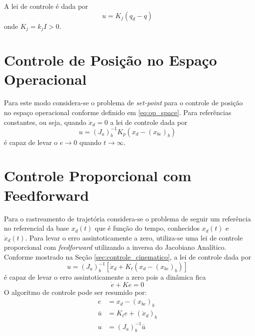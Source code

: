 A lei de controle é dada por 
\begin{equation}
{u} = {K}_j ({q}_d - {q})
\end{equation}
onde ${K_j} = k_j {I} > 0$.

\section{Controle de Posição no Espaço Operacional} \label{sec:pos_operacional}
Para este modo considera-se o problema de \textit{set-point} para o controle de posição no espaço operacional conforme definido em \ref{eq:op_space}. Para referências constantes, ou seja, quando $\dot{{x}}_d = 0$ a lei de controle dada por
\begin{equation} \label{eq:lei_posicao}
{u} = ({J}_{a})_b^{-1} {K}_p ( {x_d} - ({x_{be}})_b)
\end{equation}
é capaz de levar o ${e} \rightarrow 0$ quando $t \rightarrow \infty$.

\section{Controle Proporcional com Feedforward} \label{sec:pplusf}
Para o rastreamento de trajetória considera-se o problema de seguir um referência no referencial da base ${x}_d(t)$ que é função do tempo, conhecidos ${x}_d(t)$ e ${\dot{x}}_d(t)$. Para levar o erro assintoticamente a zero, utiliza-se uma lei de controle proporcional com \textit{feedforward} utilizando a inversa do Jacobiano Analítico. Conforme mostrado na Seção \ref{sec:controle_cinematico}, a lei de controle dada por 
\begin{equation}
{u} = ({J}_{a})_b^{-1} [\dot{{x}}_d + {K}_t ({x_d} - (x_{be})_b)]
\end{equation} 
é capaz de levar o erro assintoticamente a zero pois a dinâmica fica 
\begin{equation}
\dot{{e}} + {K} {e} = 0
\end{equation}
O algoritmo de controle pode ser resumido por:
\begin{align}
{e} &= {x}_d- (x_{be})_b  \label{eq:error_pf}\\
{\bar{u}} &= {K}_t {e} + ({\dot{x}}_d)_b \\
{u} &= ({J}_a)_b^{-1} {\bar{u}}
\end{align}


